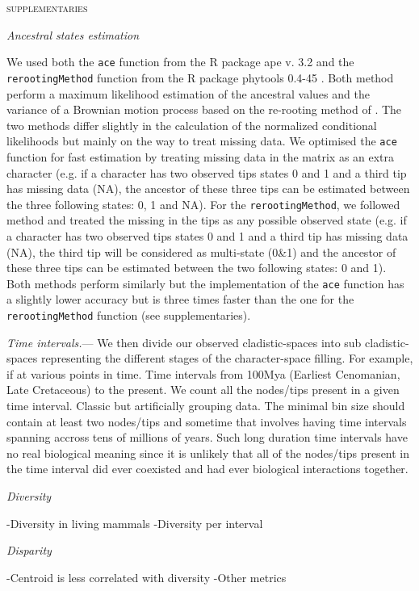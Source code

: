 \documentclass[12pt,letterpaper]{article}
\renewcommand{\section}[1]{%
\bigskip
\begin{center}
\begin{Large}
\normalfont\scshape #1
\medskip
\end{Large}
\end{center}}
\renewcommand{\subsection}[1]{%
\bigskip
\begin{center}
\begin{large}
\normalfont\itshape #1
\end{large}
\end{center}}
\renewcommand{\subsubsection}[1]{%
\vspace{2ex}
\noindent
\textit{#1.}---}
\begin{document}



\section{supplementaries}

\subsection{Ancestral states estimation}
We used both the \texttt{ace} function from the R package ape v. 3.2 \cite{paradisape:2004} and the 
\texttt{rerootingMethod} function from the R package phytools 0.4-45 \cite{phytools}. Both method perform a maximum likelihood estimation of the ancestral values and the variance of a Brownian motion process based on the re-rooting method of \cite{Yang01121995}. The two methods differ slightly in the calculation of the normalized conditional likelihoods but mainly on the way to treat missing data. We optimised the \texttt{ace} function for fast estimation by treating missing data in the matrix as an extra character (e.g. if a character has two observed tips states 0 and 1 and a third tip has missing data (NA), the ancestor of these three tips can be estimated between the three following states: 0, 1 and NA). For the \texttt{rerootingMethod}, we followed \cite{Claddis} method and treated the missing in the tips as any possible observed state (e.g. if a character has two observed tips states 0 and 1 and a third tip has missing data (NA), the third tip will be considered as multi-state (0\&1) and the ancestor of these three tips can be estimated between the two following states: 0 and 1). Both methods perform similarly but the implementation of the \texttt{ace} function has a slightly lower accuracy  but is three times faster than the one for the \texttt{rerootingMethod} function (see supplementaries).

\subsubsection{Time intervals}
We then divide our observed cladistic-spaces into sub cladistic-spaces representing the different stages of the character-space filling. For example, if at various points in time.
Time intervals from 100Mya (Earliest Cenomanian, Late Cretaceous) to the present.
We count all the nodes/tips present in a given time interval.
Classic but artificially grouping data. The minimal bin size should contain at least two nodes/tips and sometime that involves having time intervals spanning accross tens of millions of years. Such long duration time intervals have no real biological meaning since it is unlikely that all of the nodes/tips present in the time interval did ever coexisted and had ever biological interactions together.

\subsection{Diversity}
-Diversity in living mammals
-Diversity per interval

\subsection{Disparity}
-Centroid is less correlated with diversity
-Other metrics
\end{document}
